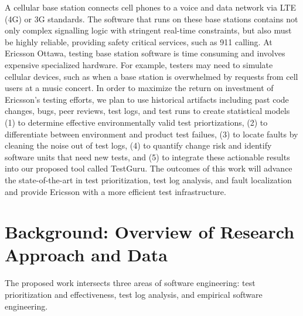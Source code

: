 A cellular base station connects cell phones to a voice and data network via
LTE (4G) or 3G standards. The software that runs on these base stations
contains not only complex signalling logic with stringent real-time
constraints, but also must be highly reliable, providing safety critical
services, such as 911 calling. At Ericsson Ottawa, testing base station
software is time consuming and involves expensive specialized hardware. For
example, testers may need to simulate cellular devices, such as when a base
station is overwhelmed by requests from cell users at a music concert. In
order to maximize the return on investment of Ericsson's testing efforts, 
we plan to use historical artifacts including past code changes, bugs, peer
reviews, test logs, and test runs to create statistical models (1) to determine effective environmentally valid test priortizations, (2) to differentiate between environment and product test failues, (3) to locate faults by cleaning the noise out of test logs, (4) to quantify change risk and identify software units that need new tests, and (5) to integrate these actionable results into our proposed tool called TestGuru. The outcomes of this work will advance the state-of-the-art
in test prioritization, test log analysis, and fault localization and provide
Ericsson with a more efficient test infrastructure.

\section*{Background: Overview of Research Approach and Data}

The proposed work intersects three areas of software engineering: test
prioritization and effectiveness, test log analysis, and empirical software engineering. 

